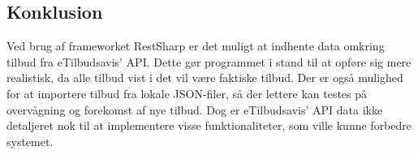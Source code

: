 \subsection{Konklusion}
Ved brug af frameworket RestSharp er det muligt at indhente data omkring tilbud fra eTilbudsavis' API. 
Dette gør programmet i stand til at opføre sig mere realistisk, da alle tilbud vist i det vil være faktiske tilbud.
Der er også mulighed for at importere tilbud fra lokale JSON-filer, så der lettere kan testes på overvågning og forekomst af nye tilbud. 
Dog er eTilbudsavis' API data ikke detaljeret nok til at implementere visse funktionaliteter, som ville kunne forbedre systemet.
